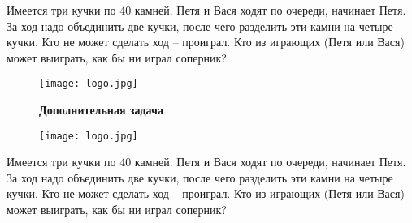 \documentclass[12 pt, a4paper]{article}%
\begin{document}
	\vspace{-2ex}
	Имеется три кучки по 40 камней. Петя и Вася ходят по очереди, начинает Петя. За ход надо объединить две кучки, после чего разделить эти камни на четыре кучки. Кто не может сделать ход – проиграл. Кто из играющих (Петя или Вася) может выиграть, как бы ни играл соперник?\\
	\vspace{4ex}
	\begin{figure}[H]
		\begin{minipage}[h]{0.33\linewidth}
			\texttt{[image: logo.jpg]}
		\end{minipage}
		\begin{minipage}[h]{0.3\linewidth}
			\centering
			\large{\textbf{Дополнительная задача}}\\
		\end{minipage}
		\begin{minipage}[h]{0.33\linewidth}
			\texttt{[image: logo.jpg]}
		\end{minipage}
		\label{ris:image1}
	\end{figure}
	\vspace{-2ex}
	Имеется три кучки по 40 камней. Петя и Вася ходят по очереди, начинает Петя. За ход надо объединить две кучки, после чего разделить эти камни на четыре кучки. Кто не может сделать ход – проиграл. Кто из играющих (Петя или Вася) может выиграть, как бы ни играл соперник?\\
	
\end{document}
